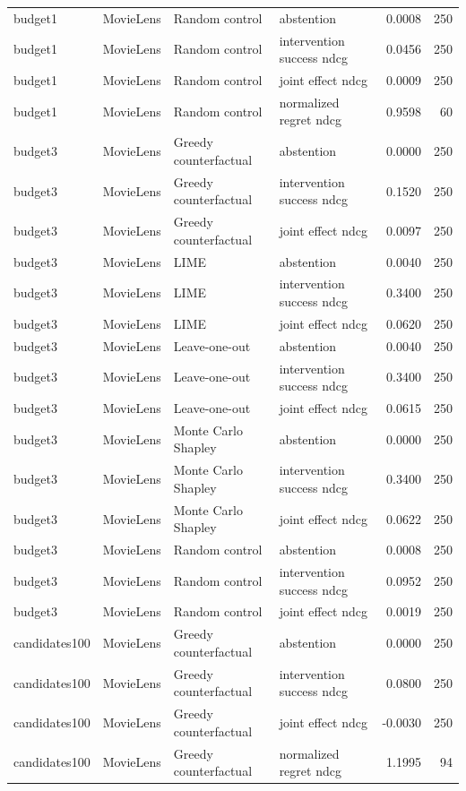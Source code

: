 \begin{longtable}{@{}p{}p{}p{}p{}rr@{}}
budget1 & MovieLens & Random control & abstention & 0.0008 & 250 \\
budget1 & MovieLens & Random control & intervention success ndcg & 0.0456 & 250 \\
budget1 & MovieLens & Random control & joint effect ndcg & 0.0009 & 250 \\
budget1 & MovieLens & Random control & normalized regret ndcg & 0.9598 & 60 \\
budget3 & MovieLens & Greedy counterfactual & abstention & 0.0000 & 250 \\
budget3 & MovieLens & Greedy counterfactual & intervention success ndcg & 0.1520 & 250 \\
budget3 & MovieLens & Greedy counterfactual & joint effect ndcg & 0.0097 & 250 \\
budget3 & MovieLens & LIME & abstention & 0.0040 & 250 \\
budget3 & MovieLens & LIME & intervention success ndcg & 0.3400 & 250 \\
budget3 & MovieLens & LIME & joint effect ndcg & 0.0620 & 250 \\
budget3 & MovieLens & Leave-one-out & abstention & 0.0040 & 250 \\
budget3 & MovieLens & Leave-one-out & intervention success ndcg & 0.3400 & 250 \\
budget3 & MovieLens & Leave-one-out & joint effect ndcg & 0.0615 & 250 \\
budget3 & MovieLens & Monte Carlo Shapley & abstention & 0.0000 & 250 \\
budget3 & MovieLens & Monte Carlo Shapley & intervention success ndcg & 0.3400 & 250 \\
budget3 & MovieLens & Monte Carlo Shapley & joint effect ndcg & 0.0622 & 250 \\
budget3 & MovieLens & Random control & abstention & 0.0008 & 250 \\
budget3 & MovieLens & Random control & intervention success ndcg & 0.0952 & 250 \\
budget3 & MovieLens & Random control & joint effect ndcg & 0.0019 & 250 \\
candidates100 & MovieLens & Greedy counterfactual & abstention & 0.0000 & 250 \\
candidates100 & MovieLens & Greedy counterfactual & intervention success ndcg & 0.0800 & 250 \\
candidates100 & MovieLens & Greedy counterfactual & joint effect ndcg & -0.0030 & 250 \\
candidates100 & MovieLens & Greedy counterfactual & normalized regret ndcg & 1.1995 & 94 \\

\end{longtable}
